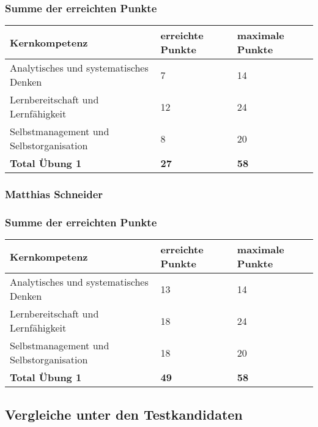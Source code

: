 \subsubsection{Summe der erreichten Punkte}
\begin{center}
  \begin{tabular}{ | p{7cm} | p{3cm} | p{3cm} |}
   \hline
   \textbf{Kernkompetenz} & \textbf{erreichte Punkte} & \textbf{maximale Punkte} \\ \hline
   Analytisches und systematisches Denken & 7 & 14\\ \hline
  Lernbereitschaft und Lernfähigkeit & 12 & 24\\ \hline
   Selbstmanagement und Selbstorganisation & 8 & 20\\ \hline
   \textbf{Total Übung 1} & \textbf{27} & \textbf{58}\\ \hline
  \end{tabular}
\end{center}

\subsubsection{Matthias Schneider}

\subsubsection{Summe der erreichten Punkte}
\begin{center}
  \begin{tabular}{ | p{7cm} | p{3cm} | p{3cm} |}
   \hline
   \textbf{Kernkompetenz} & \textbf{erreichte Punkte} & \textbf{maximale Punkte} \\ \hline
   Analytisches und systematisches Denken & 13 & 14\\ \hline
  Lernbereitschaft und Lernfähigkeit & 18 & 24\\ \hline
   Selbstmanagement und Selbstorganisation & 18 & 20\\ \hline
   \textbf{Total Übung 1} & \textbf{49} & \textbf{58}\\ \hline
  \end{tabular}
\end{center}

\subsection{Vergleiche unter den Testkandidaten}

